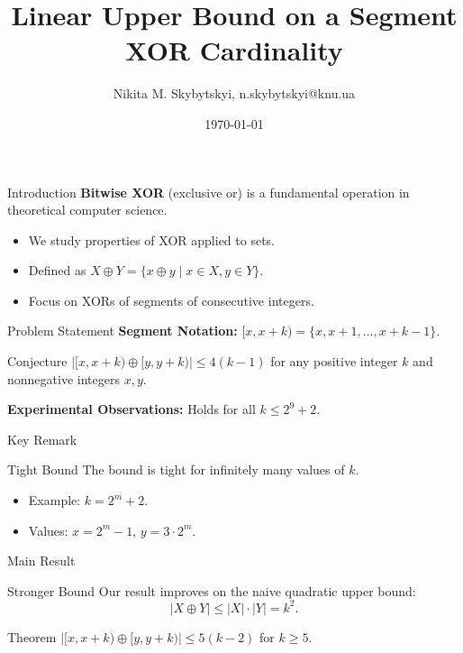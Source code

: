 \documentclass[handout,notheorems]{beamer}
\institute[KNU]{Taras Shevchenko National University of Kyiv}
\author[Skybytskyi N.]{Nikita M. Skybytskyi, n.skybytskyi@knu.ua}
\title[Linear Upper Bound on a Segment XOR Cardinality]{Linear Upper Bound on a Segment XOR Cardinality}
\date{\today}
\theoremstyle{definition}
\begin{document}
\begin{frame}
    \titlepage
\end{frame}

\begin{frame}{Introduction}
    \textbf{Bitwise XOR} (exclusive or) is a fundamental operation in theoretical computer science.
    \begin{itemize}
        \item We study properties of XOR applied to sets.
        \item Defined as $X \oplus Y = \{ x \oplus y \mid x \in X, y \in Y \}$.
        \item Focus on XORs of segments of consecutive integers.
    \end{itemize}
\end{frame}

\begin{frame}{Problem Statement}
    \textbf{Segment Notation:} $[x, x+k) = \{x, x+1, \dots, x+k-1\}$.
    \begin{block}{Conjecture}
        $|[x, x+k) \oplus [y, y+k)| \leq 4(k-1)$ for any positive integer $k$ and nonnegative integers $x, y$.
    \end{block}
    \textbf{Experimental Observations:} Holds for all $k \leq 2^9 + 2$.
\end{frame}

\begin{frame}{Key Remark}
    \begin{block}{Tight Bound}
        The bound is tight for infinitely many values of $k$.
        \begin{itemize}
            \item Example: $k = 2^m + 2$.
            \item Values: $x = 2^m - 1$, $y = 3 \cdot 2^m$.
        \end{itemize}
    \end{block}
\end{frame}

\begin{frame}{Main Result}
    \begin{block}{Stronger Bound}
        Our result improves on the naive quadratic upper bound:
        \[|X \oplus Y| \leq |X| \cdot |Y| = k^2.\]
    \end{block}
    \begin{block}{Theorem}
        $|[x, x+k) \oplus [y, y+k)| \leq 5(k-2)$ for $k \geq 5$.
    \end{block}
\end{frame}
\end{document}
